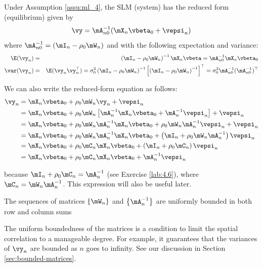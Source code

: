 Under Assumption \ref{assu:ml_4}, the SLM (system) has the reduced form (equilibrium) given by
\begin{equation}
\vy = \mA^{-1}_{n0}(\mX_n\vbeta_0 + \vepsi_n)
\end{equation}
%
where $\mA^{-1}_{n0} = (\mI_n - \rho_0\mW_n)$ and with the following expectation and variance:
\begin{eqnarray}
\E(\vy_n)   &=& \left(\mI_n - \rho_0\mW_n\right)^{-1}\mX_n\vbeta  = \mA_{n0}^{-1}\mX_n\vbeta_0\\
\var(\vy_n) &=& \E(\vy_n\vy_n^\top) = \sigma^2_{0}\left(\mI_n - \rho_0\mW_n\right)^{-1}\left[\left(\mI_n - \rho_0\mW_n\right)^{-1}\right]^\top = \sigma^2_0\mA_{n0}^{-1}(\mA_{n0}^{-1})^\top
\end{eqnarray}

We can also write the reduced-form equation as follows:
\begin{equation}
	\begin{aligned}
	\vy_n & = \mX_n\vbeta_0 + \rho_0\mW_n\vy_n + \vepsi_n \\
	      & = \mX_n\vbeta_0 + \rho_0\mW_n\left[\mA^{-1}_n\mX_n\vbeta_0 + \mA^{-1}_n\vepsi_n\right] + \vepsi_n \\
	      & = \mX_n\vbeta_0 + \rho_0\mW_n\mA^{-1}_n\mX_n\vbeta_0 + \rho_0\mW_n\mA^{-1}_n\vepsi_n + \vepsi_n \\
	      & = \mX_n\vbeta_0 + \rho_0\mW_n\mA^{-1}_n\mX_n\vbeta_0  + \left(\mI_n + \rho_0\mW_n\mA^{-1}_n\right)\vepsi_n \\
	      & = \mX_n\vbeta_0 + \rho_0\mC_n\mX_n\vbeta_0  + \left(\mI_n + \rho_0\mC_n\right)\vepsi_n \\
	      & = \mX_n\vbeta_0 + \rho_0\mC_n\mX_n\vbeta_0  +\mA_n^{-1}\vepsi_n
	\end{aligned}
\end{equation}

because $\mI_n + \rho_0\mC_n = \mA_n^{-1}$ (see Exercise  \ref{lab:4.6}), where $\mC_n=\mW_n\mA_n^{-1}$. This expression will also be useful later. 


\begin{assumption}\label{assu:ml_5}
	The sequences of matrices $\left\lbrace \mW_n \right\rbrace$ and $\left\lbrace \mA_n^{-1} \right\rbrace$ are uniformly bounded in both row and column sums 
\end{assumption}

The uniform boundedness of the matrices is a condition to limit the spatial correlation to a manageable degree. For example, it guarantees that the variances of $\vy_n$ are bounded as $n$ goes to infinity. See our discussion in Section \ref{sec:bounded-matrices}.

